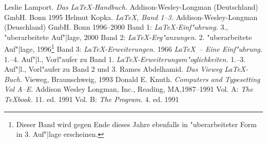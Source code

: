 \documentclass{report}
\begin{document}
\begin{thebibliography}{\hspace{1.5cm}}
 Leslie Lamport. \textsl{Das \LaTeX-Handbuch.}
    Addison-Wesley-Longman (Deutschland) GmbH. Bonn 1995
 Helmut Kopka. \textsl{\LaTeX, Band 1--3.} 
    Addison-Wesley-Longman (Deuschland) GmbH. Bonn 1996--2000
 Band 1: \textsl{\LaTeX-Einf"uhrung.} 3., "uberarbeitete
    Auf"|lage, 2000
 Band 2: \textsl{\LaTeX-Erg"anzungen.} 2. "uberarbeitete
    Auf"|lage, 1996\footnote{Dieser Band wird gegen Ende dieses Jahre ebenfalls
    in "uberarbeiteter Form in 3. Auf"|lage erscheinen.}
 Band 3: \textsl{\LaTeX-Erweiterungen.} 1966
 \textsl{\LaTeX\ -- Eine Einf"uhrung.} 1.--4. Auf"|l.,
    Vorl"aufer zu Band 1.
 \textsl{\LaTeX-Erweiterungsm"oglichkeiten.} 
    1.--3. Auf"|l., Vorl"aufer zu Band 2 und 3.
 Rames Abdelhamid. \textsl{Das Vieweg \LaTeX-Buch.}
    Vieweg, Braunschweig, 1993
 Donald E. Knuth. \textsl{Computers and Typesetting
    Vol A--E.} Addison Wesley Longman, Inc., Reading, MA,1987--1991
 Vol. A: \textsl{The \TeX book.} 11. ed. 1991
 Vol. B: \textsl{The Program.} 4. ed. 1991
\end{thebibliography}
\end{document}
